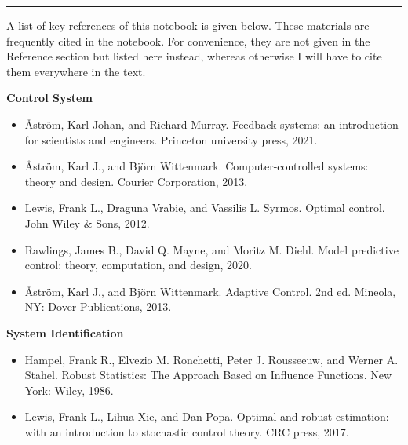 \vspace{0.1in}
\noindent \rule{1in}{0.4pt}
\vspace{0.1in}

A list of key references of this notebook is given below. These materials are frequently cited in the notebook. For convenience, they are not given in the Reference section but listed here instead, whereas otherwise I will have to cite them everywhere in the text.

\vspace{0.1in}
\noindent \textbf{Control System}
\vspace{0.1in}

\begin{itemize}
	\item Åström, Karl Johan, and Richard Murray. Feedback systems: an introduction for scientists and engineers. Princeton university press, 2021.
	\item Åström, Karl J., and Björn Wittenmark. Computer-controlled systems: theory and design. Courier Corporation, 2013.
	\item Lewis, Frank L., Draguna Vrabie, and Vassilis L. Syrmos. Optimal control. John Wiley \& Sons, 2012.
	\item Rawlings, James B., David Q. Mayne, and Moritz M. Diehl. Model predictive control: theory, computation, and design, 2020.
	\item Åström, Karl J., and Björn Wittenmark. Adaptive Control. 2nd ed. Mineola, NY: Dover Publications, 2013.
\end{itemize}

\vspace{0.1in}
\noindent \textbf{System Identification}
\vspace{0.1in}

\begin{itemize}
	\item Hampel, Frank R., Elvezio M. Ronchetti, Peter J. Rousseeuw, and Werner A. Stahel. Robust Statistics: The Approach Based on Influence Functions. New York: Wiley, 1986.
	\item Lewis, Frank L., Lihua Xie, and Dan Popa. Optimal and robust estimation: with an introduction to stochastic control theory. CRC press, 2017.
\end{itemize}